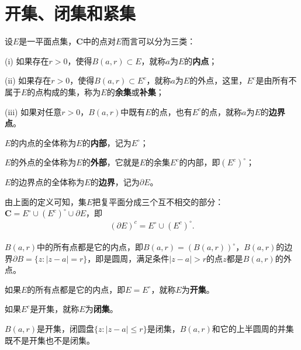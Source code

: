 \documentclass[../../main.tex]{subfiles}
\begin{document}
\section{开集、闭集和紧集}

\begin{definition}
设\(E\)是一平面点集，\(\mathbf{C}\)中的点对\(E\)而言可以分为三类：

(i) 如果存在\(r > 0\)，使得\(B(a, r) \subset E\)，就称\(a\)为\(E\)的\textbf{内点}；

(ii) 如果存在\(r > 0\)，使得\(B(a, r) \subset E^c\)，就称\(a\)为\(E\)的外点，这里，\(E^c\)是由所有不属于\(E\)的点构成的集，称为\(E\)的\textbf{余集}或\textbf{补集}；

(iii) 如果对任意\(r > 0\)，\(B(a, r)\)中既有\(E\)的点，也有\(E^c\)的点，就称\(a\)为\(E\)的\textbf{边界点}。
\end{definition}

\begin{definition}
\(E\)的内点的全体称为\(E\)的\textbf{内部}，记为\(E^\circ\)；

\(E\)的外点的全体称为\(E\)的\textbf{外部}，它就是\(E\)的余集\(E^c\)的内部，即\((E^c)^\circ\)；

\(E\)的边界点的全体称为\(E\)的\textbf{边界}，记为\(\partial E\)。
\end{definition}
\begin{note}
由上面的定义可知，集\(E\)把复平面分成三个互不相交的部分：\(\mathbf{C} = E^\circ \cup (E^c)^\circ \cup \partial E\)，即
\begin{align}\label{equation:::2318}
(\partial E)^c = E^\circ \cup (E^c)^\circ. 
\end{align}
\end{note}

\begin{example}[邻域的内部和边界]
\(B(a, r)\)中的所有点都是它的内点，即\(B(a, r) = (B(a, r))^\circ\)，\(B(a, r)\)的边界\(\partial B = \{ z : | z - a | = r \}\)，即是圆周，满足条件\(| z - a | > r\)的点\(z\)都是\(B(a, r)\)的外点。
\end{example}

\begin{definition}
如果\(E\)的所有点都是它的内点，即\(E = E^\circ\)，就称\(E\)为\textbf{开集}。

如果\(E^c\)是开集，就称\(E\)为\textbf{闭集}。
\end{definition}

\begin{example}
\(B(a, r)\)是开集，闭圆盘\(\{ z : | z - a | \leqslant r \}\)是闭集，\(B(a, r)\)和它的上半圆周的并集既不是开集也不是闭集。
\end{example}
\end{document}

